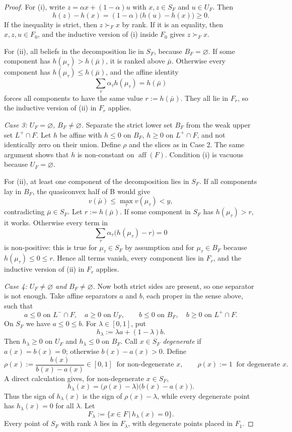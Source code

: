 \documentclass[11pt]{article}
\newcommand{\sep}{\,|\,}
\newcommand{\aff}{\operatorname{aff}}
\begin{document}
\begin{proof}
For (i), write $z=\alpha x+(1-\alpha)u$ with $x,z\in S_F$ and $u\in U_F$. Then
\[
    h(z)-h(x)=(1-\alpha)\bigl(h(u)-h(x)\bigr)\geq0.
\]
If the inequality is strict, then $z\succ_F x$ by rank. If it is an equality, then $x,z,u\in F_0$, and the inductive version of (i) inside $F_0$ gives $z\succ_F x$.

For (ii), all beliefs in the decomposition lie in $S_F$, because $B_F=\varnothing$. If some component has $h(\mu_\tau)>h(\bar\mu)$, it is ranked above $\bar\mu$. Otherwise every component has $h(\mu_\tau)\leq h(\bar\mu)$, and the affine identity
\[
    \sum_\tau\alpha_\tau h(\mu_\tau)=h(\bar\mu)
\]
forces all components to have the same value $r:=h(\bar\mu)$. They all lie in $F_r$, so the inductive version of (ii) in $F_r$ applies.

\emph{Case 3: $U_F=\varnothing$, $B_F\neq\varnothing$.} Separate the strict lower set $B_F$ from the weak upper set $L^{+}\cap F$. Let $h$ be affine with $h\leq0$ on $B_F$, $h\geq0$ on $L^{+}\cap F$, and not identically zero on their union. Define $\rho$ and the slices as in Case 2. The same argument shows that $h$ is non-constant on $\aff(F)$. Condition (i) is vacuous because $U_F=\varnothing$.

For (ii), at least one component of the decomposition lies in $S_F$. If all components lay in $B_F$, the quasiconvex half of B would give
\[
    v(\bar\mu)\leq\max_\tau v(\mu_\tau)<y,
\]
contradicting $\bar\mu\in S_F$. Let $r:=h(\bar\mu)$. If some component in $S_F$ has $h(\mu_\tau)>r$, it works. Otherwise every term in
\[
    \sum_\tau\alpha_\tau\bigl(h(\mu_\tau)-r\bigr)=0
\]
is non-positive: this is true for $\mu_\tau\in S_F$ by assumption and for $\mu_\tau\in B_F$ because $h(\mu_\tau)\leq0\leq r$. Hence all terms vanish, every component lies in $F_r$, and the inductive version of (ii) in $F_r$ applies.

\emph{Case 4: $U_F\neq\varnothing$ and $B_F\neq\varnothing$.} Now both strict sides are present, so one separator is not enough. Take affine separators $a$ and $b$, each proper in the sense above, such that
\[
    a\leq0\text{ on }L^{-}\cap F,\quad a\geq0\text{ on }U_F,
    \qquad
    b\leq0\text{ on }B_F,\quad b\geq0\text{ on }L^{+}\cap F.
\]
On $S_F$ we have $a\leq0\leq b$. For $\lambda\in[0,1]$, put
\[
    h_\lambda:=\lambda a+(1-\lambda)b.
\]
Then $h_\lambda\geq0$ on $U_F$ and $h_\lambda\leq0$ on $B_F$. Call $x\in S_F$ \emph{degenerate} if $a(x)=b(x)=0$; otherwise $b(x)-a(x)>0$. Define
\[
    \rho(x):=\frac{b(x)}{b(x)-a(x)}\in[0,1]\ \text{ for non-degenerate }x,
    \qquad
    \rho(x):=1\ \text{ for degenerate }x.
\]
A direct calculation gives, for non-degenerate $x\in S_F$,
\[
    h_\lambda(x)=\bigl(\rho(x)-\lambda\bigr)\bigl(b(x)-a(x)\bigr).
\]
Thus the sign of $h_\lambda(x)$ is the sign of $\rho(x)-\lambda$, while every degenerate point has $h_\lambda(x)=0$ for all $\lambda$. Let
\[
    F_\lambda:=\{x\in F\sep h_\lambda(x)=0\}.
\]
Every point of $S_F$ with rank $\lambda$ lies in $F_\lambda$, with degenerate points placed in $F_1$.


\end{proof}
\end{document}
